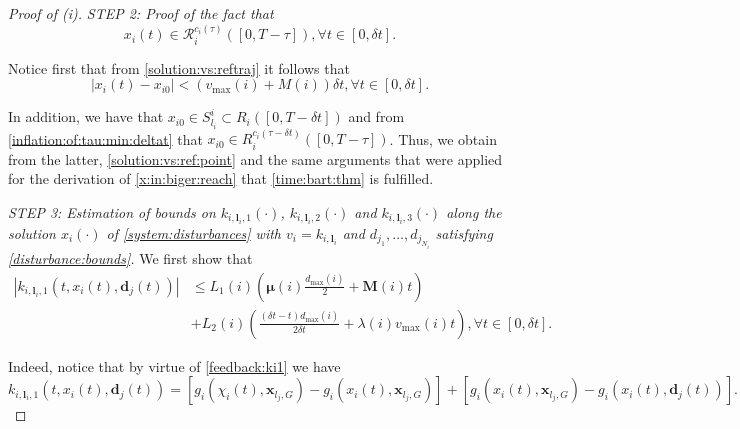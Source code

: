 \documentclass[reqno]{amsart}
\theoremstyle{plain}
\theoremstyle{definition}
\numberwithin{equation}{section}
\begin{document}
\begin{proof}[Proof of (i)]
\noindent \textit{STEP 2: Proof of the fact that} 
\begin{equation} \label{time:bart:thm}
x_i(t)\in{\ensuremath{\mathcal{R}}}_i^{c_i(\tau)}([0,T-\tau]), \forall t\in[0,\delta t].
\end{equation}

\noindent Notice first that from \eqref{solution:vs:reftraj} it follows that  
\begin{equation} \label{solution:vs:ref:point}
|x_i(t)-x_{i0}|< (v_{\max}(i)+M(i))\delta t,\forall t\in[0,\delta t].
\end{equation}

\noindent In addition, we have that $x_{i0}\in  S_{l_i}^i\subset R_i([0,T-\delta t])$ and from \eqref{inflation:of:tau:min:deltat} that  $x_{i0}\in  R_i^{c_i(\tau-\delta t)}([0,T-\tau])$. Thus, we obtain from the latter, \eqref{solution:vs:ref:point} and the same arguments that were applied for the derivation of \eqref{x:in:biger:reach} that \eqref{time:bart:thm} is fulfilled. 

\noindent \textit{STEP 3: Estimation of bounds on $k_{i,{\textbf{{l}}}_i,1}(\cdot)$, $k_{i,{\textbf{{l}}}_i,2}(\cdot)$ and $k_{i,{\textbf{{l}}}_i,3}(\cdot)$ along the solution $x_i(\cdot)$ of \eqref{system:disturbances} with $v_i=k_{i,{\textbf{{l}}}_i}$ and $d_{j_1},\ldots,d_{j_{N_i}}$ satisfying  \eqref{disturbance:bounds}.}  We first show that
\begin{align}
|k_{i,{\textbf{{l}}}_i,1}(t,x_{i}(t),{\textbf{{d}}}_j(t))| & \le L_{1}(i)\left({\ensuremath{\boldsymbol{{\mu}}}}(i)\frac{d_{\max}(i)}{2}+{\textbf{{M}}}(i)t\right) \nonumber \\
& +L_{2}(i)\left(\frac{(\delta t-t)d_{\max}(i)}{2\delta t}+\lambda(i)v_{\max}(i)t\right), \forall t\in[0,\delta t]. \label{ki1:bound}
\end{align}

\noindent Indeed, notice that by virtue of \eqref{feedback:ki1} we have
\begin{equation}  \label{ki1:equiv}
k_{i,{\textbf{{l}}}_i,1}(t,x_{i}(t),{\textbf{{d}}}_j(t))=[g_i(\chi_i(t),{\textbf{{x}}}_{l_j,G})-g_i(x_i(t),{\textbf{{x}}}_{l_j,G})]+[g_i(x_i(t),{\textbf{{x}}}_{l_j,G})-g_i(x_i(t),{\textbf{{d}}}_j(t))].
\end{equation}


\end{proof}
\end{document}
